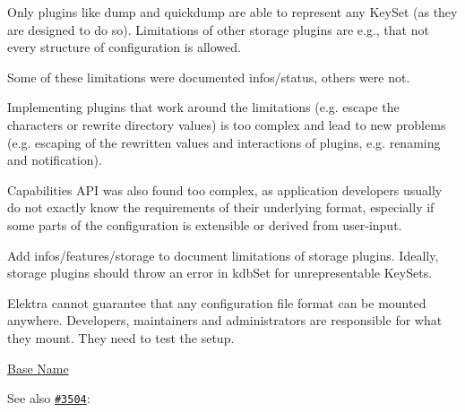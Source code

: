 Only plugins like {\ttfamily dump} and {\ttfamily quickdump} are able to represent any Key\+Set (as they are designed to do so). Limitations of other storage plugins are e.\+g., that not every structure of configuration is allowed.

Some of these limitations were documented {\ttfamily infos/status}, others were not.


\begin{DoxyItemize}
\item Implementing plugins that work around the limitations (e.\+g. escape the characters or rewrite directory values) is too complex and lead to new problems (e.\+g. escaping of the rewritten values and interactions of plugins, e.\+g. renaming and notification).
\item Capabilities A\+PI was also found too complex, as application developers usually do not exactly know the requirements of their underlying format, especially if some parts of the configuration is extensible or derived from user-\/input.
\end{DoxyItemize}

Add {\ttfamily infos/features/storage} to document limitations of storage plugins. Ideally, storage plugins should throw an error in {\ttfamily kdb\+Set} for unrepresentable Key\+Sets.

Elektra cannot guarantee that any configuration file format can be mounted anywhere. Developers, maintainers and administrators are responsible for what they mount. They need to test the setup.


\begin{DoxyItemize}
\item \hyperlink{doc_decisions_base_name_md}{Base Name}
\end{DoxyItemize}

See also \href{https://issues.libelektra.org/3504}{\tt \#3504}\+: 